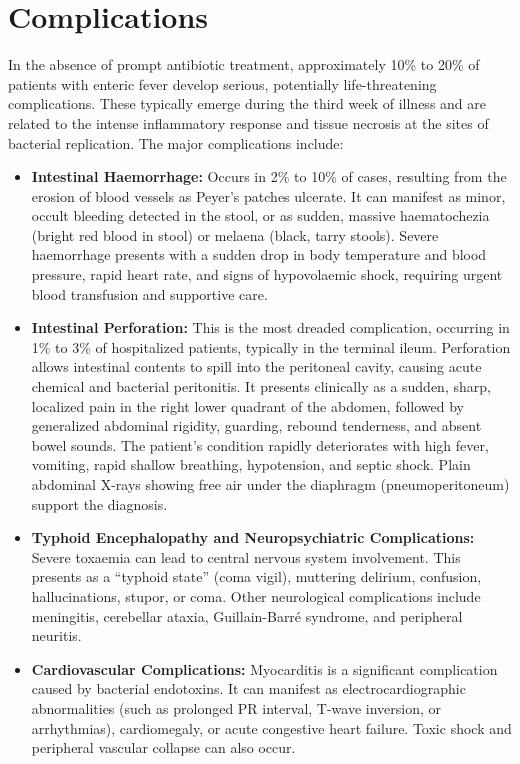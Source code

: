 \section*{Complications}
In the absence of prompt antibiotic treatment, approximately 10\% to 20\% of patients with enteric fever develop serious, potentially life-threatening complications. These typically emerge during the third week of illness and are related to the intense inflammatory response and tissue necrosis at the sites of bacterial replication.
The major complications include:
\begin{itemize}
\item \textbf{Intestinal Haemorrhage:} Occurs in 2\% to 10\% of cases, resulting from the erosion of blood vessels as Peyer's patches ulcerate. It can manifest as minor, occult bleeding detected in the stool, or as sudden, massive haematochezia (bright red blood in stool) or melaena (black, tarry stools). Severe haemorrhage presents with a sudden drop in body temperature and blood pressure, rapid heart rate, and signs of hypovolaemic shock, requiring urgent blood transfusion and supportive care.
\item \textbf{Intestinal Perforation:} This is the most dreaded complication, occurring in 1\% to 3\% of hospitalized patients, typically in the terminal ileum. Perforation allows intestinal contents to spill into the peritoneal cavity, causing acute chemical and bacterial peritonitis. It presents clinically as a sudden, sharp, localized pain in the right lower quadrant of the abdomen, followed by generalized abdominal rigidity, guarding, rebound tenderness, and absent bowel sounds. The patient's condition rapidly deteriorates with high fever, vomiting, rapid shallow breathing, hypotension, and septic shock. Plain abdominal X-rays showing free air under the diaphragm (pneumoperitoneum) support the diagnosis.
\item \textbf{Typhoid Encephalopathy and Neuropsychiatric Complications:} Severe toxaemia can lead to central nervous system involvement. This presents as a ``typhoid state'' (coma vigil), muttering delirium, confusion, hallucinations, stupor, or coma. Other neurological complications include meningitis, cerebellar ataxia, Guillain-Barr\'e syndrome, and peripheral neuritis.
\item \textbf{Cardiovascular Complications:} Myocarditis is a significant complication caused by bacterial endotoxins. It can manifest as electrocardiographic abnormalities (such as prolonged PR interval, T-wave inversion, or arrhythmias), cardiomegaly, or acute congestive heart failure. Toxic shock and peripheral vascular collapse can also occur.

\end{itemize}
